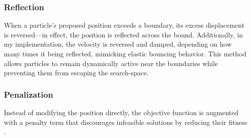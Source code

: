 {\subsubsection{Reflection}
    When a particle's proposed position exceeds a boundary, its excess displacement is reversed---in effect, the position is reflected across the bound. 
Additionally, in my implementation, the velocity is reversed and damped, depending on how many times it being reflected, mimicking elastic bouncing behavior.
% 
% 
% 
This method allows particles to remain dynamically active near the boundaries while preventing them from escaping the \gls{search-space}.

\subsubsection{Penalization}
    Instead of modifying the position directly, the objective function is augmented with a penalty term that discourages infeasible solutions by reducing their fitness \citep[see, e.g.,][]{parsopoulos2002particle}.
}
